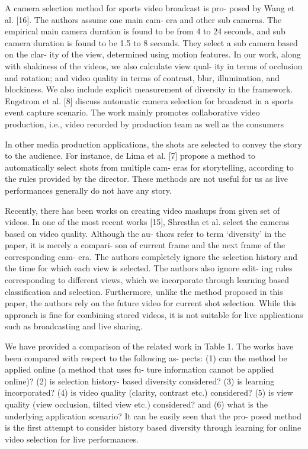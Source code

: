 \documentclass{sig-alternate-05-2015}
\begin{document}
A camera selection method for sports video broadcast is pro-
posed by Wang et al. [16]. The authors assume one main cam-
era and other sub cameras. The empirical main camera duration is
found to be from 4 to 24 seconds, and sub camera duration is found
to be 1.5 to 8 seconds. They select a sub camera based on the clar-
ity of the view, determined using motion features. In our work,
along with shakiness of the videos, we also calculate view qual-
ity in terms of occlusion and rotation; and video quality in terms
of contrast, blur, illumination, and blockiness. We also include
explicit measurement of diversity in the framework. Engstrom et
al. [8] discuss automatic camera selection for broadcast in a sports
event capture scenario. The work mainly promotes collaborative
video production, i.e., video recorded by production team as well
as the consumers

In other media production applications, the shots are selected to
convey the story to the audience. For instance, de Lima et al. [7] propose a method to automatically select shots from multiple cam-
eras for storytelling, according to the rules provided by the director.
These methods are not useful for us as live performances generally
do not have any story.

Recently, there has been works on creating video mashups from
given set of videos. In one of the most recent works [15], Shrestha
et al. select the cameras based on video quality. Although the au-
thors refer to term ‘diversity’ in the paper, it is merely a compari-
son of current frame and the next frame of the corresponding cam-
era. The authors completely ignore the selection history and the
time for which each view is selected. The authors also ignore edit-
ing rules corresponding to different views, which we incorporate
through learning based classification and selection. Furthermore,
unlike the method proposed in this paper, the authors rely on the
future video for current shot selection. While this approach is fine
for combining stored videos, it is not suitable for live applications
such as broadcasting and live sharing.

We have provided a comparison of the related work in Table 1.
The works have been compared with respect to the following as-
pects: (1) can the method be applied online (a method that uses fu-
ture information cannot be applied online)? (2) is selection history-
based diversity considered? (3) is learning incorporated? (4) is
video quality (clarity, contrast etc.) considered? (5) is view quality
(view occlusion, tilted view etc.) considered? and (6) what is the
underlying application scenario? It can be easily seen that the pro-
posed method is the first attempt to consider history based diversity
through learning for online video selection for live performances.
\end{document}
